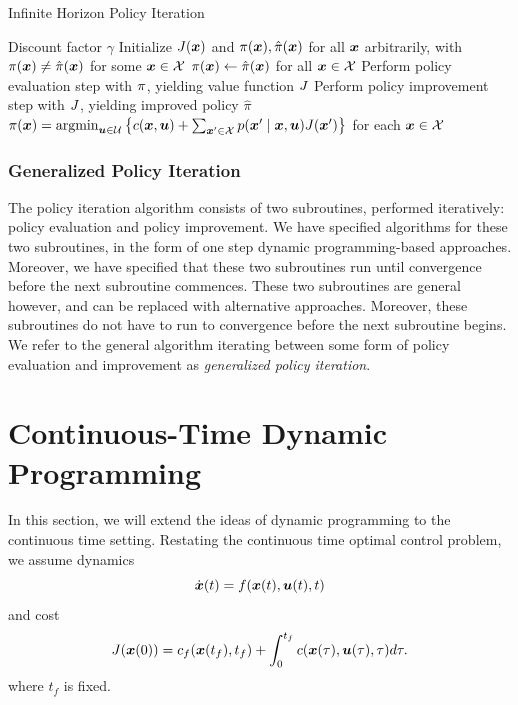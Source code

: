 \begin{algorithm}[t]
\caption{Infinite Horizon Policy Iteration}
\centering
\label{alg:PI}
\begin{algorithmic}[1]
    \Require Discount factor $\gamma$
    \State Initialize $J(\bm{x})$ and $\pi(\bm{x}), \hat{\pi}(\bm{x})$ for all $\bm{x}$ arbitrarily, with $\pi(\bm{x}) \neq \hat{\pi}(\bm{x})$ for some $\bm{x} \in \mathcal{X}$
        \State $\pi(\bm{x}) \gets \hat{\pi}(\bm{x})$ for all $\bm{x} \in \mathcal{X}$
        \State Perform policy evaluation step with $\pi$, yielding value function $J$
        \State Perform policy improvement step with $J$, yielding improved policy $\hat{\pi}$
    \EndWhile
    \State \Return $\pi(\bm{x}) = \text{argmin}_{\bm{u}\in\mathcal{U}} \left\{c(\bm{x}, \bm{u}) + \sum_{\bm{x}' \in \mathcal{X}} p(\bm{x}' \mid \bm{x}, \bm{u}) J(\bm{x}')\right\}$ for each $\bm{x} \in \mathcal{X}$
\end{algorithmic}
\end{algorithm}


\subsubsection{Generalized Policy Iteration} 

The policy iteration algorithm consists of two subroutines, performed iteratively: policy evaluation and policy improvement. We have specified algorithms for these two subroutines, in the form of one step dynamic programming-based approaches. Moreover, we have specified that these two subroutines run until convergence before the next subroutine commences. These two subroutines are general however, and can be replaced with alternative approaches. Moreover, these subroutines do not have to run to convergence before the next subroutine begins. We refer to the general algorithm iterating between some form of policy evaluation and improvement as \textit{generalized policy iteration}. 

\section{Continuous-Time Dynamic Programming}


In this section, we will extend the ideas of dynamic programming to the continuous time setting. Restating the continuous time optimal control problem, we assume dynamics
\begin{equation}
    \dot{\bm{x}}(t) = f(\bm{x}(t),\bm{u}(t),t)
\end{equation}
and cost
\begin{equation}
    J(\bm{x}(0)) = c_f(\bm{x}(t_f),t_f) + \int_0^{t_f} c(\bm{x}(\tau),\bm{u}(\tau),\tau) d\tau.
\end{equation}
where $t_f$ is fixed. 


